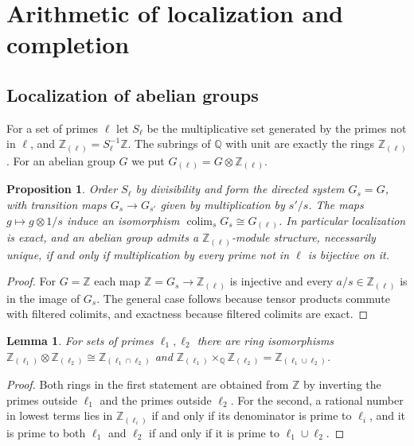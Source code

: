 \documentclass[11pt]{amsart}
\theoremstyle{plain}
\newtheorem{proposition}[theorem]{Proposition}
\newtheorem{lemma}[theorem]{Lemma}
\theoremstyle{definition}
\numberwithin{equation}{section}
\newcommand{\Z}{\mathbb{Z}}
\newcommand{\Q}{\mathbb{Q}}
\newcommand{\Zl}{\mathbb{Z}_{(\ell)}}
\DeclareMathOperator{\colim}{colim}
\begin{document}
\section{Arithmetic of localization and completion}\label{sec:algebra}

\subsection{Localization of abelian groups}
For a set of primes $\ell$ let $S_\ell$ be the multiplicative set generated by the primes not in $\ell$, and $\Zl=S_\ell^{-1}\Z$.
The subrings of $\Q$ with unit are exactly the rings $\Zl$.
For an abelian group $G$ we put $G_{(\ell)}=G\otimes\Zl$.

\begin{proposition}\label{prop:loccolim}
Order $S_\ell$ by divisibility and form the directed system $G_s=G$, with transition maps $G_s\to G_{s'}$ given by multiplication by $s'/s$.
The maps $g\mapsto g\otimes 1/s$ induce an isomorphism $\colim_sG_s\cong G_{(\ell)}$.
In particular localization is exact, and an abelian group admits a $\Zl$-module structure, necessarily unique, if and only if multiplication by every prime not in $\ell$ is bijective on it.
\end{proposition}

\begin{proof}
For $G=\Z$ each map $\Z=G_s\to\Zl$ is injective and every $a/s\in\Zl$ is in the image of $G_s$.
The general case follows because tensor products commute with filtered colimits, and exactness because filtered colimits are exact.
\end{proof}

\begin{lemma}\label{lem:tensorlocal}
For sets of primes $\ell_1,\ell_2$ there are ring isomorphisms $\Z_{(\ell_1)}\otimes\Z_{(\ell_2)}\cong\Z_{(\ell_1\cap\ell_2)}$ and $\Z_{(\ell_1)}\times_\Q\Z_{(\ell_2)}=\Z_{(\ell_1\cup\ell_2)}$.
\end{lemma}

\begin{proof}
Both rings in the first statement are obtained from $\Z$ by inverting the primes outside $\ell_1$ and the primes outside $\ell_2$.
For the second, a rational number in lowest terms lies in $\Z_{(\ell_i)}$ if and only if its denominator is prime to $\ell_i$, and it is prime to both $\ell_1$ and $\ell_2$ if and only if it is prime to $\ell_1\cup\ell_2$.
\end{proof}
\end{document}
